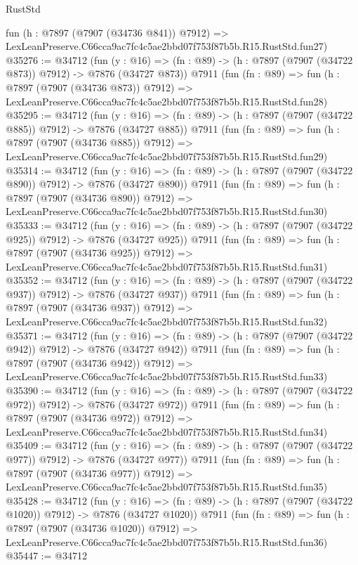 \begin{lexlean}{RustStd}
\begin{coremodule}
    fun (h : @7897 (@7907 (@34736 @841)) @7912) =>
    LexLeanPreserve.C66cca9ac7fc4c5ae2bbd07f753f87b5b.R15.RustStd.fun27)
@35276 := @34712
    (fun (y : @16) => (fn : @89) -> (h : @7897 (@7907 (@34722 @873)) @7912) -> @7876 (@34727 @873))
    @7911
    (fun (fn : @89) =>
    fun (h : @7897 (@7907 (@34736 @873)) @7912) =>
    LexLeanPreserve.C66cca9ac7fc4c5ae2bbd07f753f87b5b.R15.RustStd.fun28)
@35295 := @34712
    (fun (y : @16) => (fn : @89) -> (h : @7897 (@7907 (@34722 @885)) @7912) -> @7876 (@34727 @885))
    @7911
    (fun (fn : @89) =>
    fun (h : @7897 (@7907 (@34736 @885)) @7912) =>
    LexLeanPreserve.C66cca9ac7fc4c5ae2bbd07f753f87b5b.R15.RustStd.fun29)
@35314 := @34712
    (fun (y : @16) => (fn : @89) -> (h : @7897 (@7907 (@34722 @890)) @7912) -> @7876 (@34727 @890))
    @7911
    (fun (fn : @89) =>
    fun (h : @7897 (@7907 (@34736 @890)) @7912) =>
    LexLeanPreserve.C66cca9ac7fc4c5ae2bbd07f753f87b5b.R15.RustStd.fun30)
@35333 := @34712
    (fun (y : @16) => (fn : @89) -> (h : @7897 (@7907 (@34722 @925)) @7912) -> @7876 (@34727 @925))
    @7911
    (fun (fn : @89) =>
    fun (h : @7897 (@7907 (@34736 @925)) @7912) =>
    LexLeanPreserve.C66cca9ac7fc4c5ae2bbd07f753f87b5b.R15.RustStd.fun31)
@35352 := @34712
    (fun (y : @16) => (fn : @89) -> (h : @7897 (@7907 (@34722 @937)) @7912) -> @7876 (@34727 @937))
    @7911
    (fun (fn : @89) =>
    fun (h : @7897 (@7907 (@34736 @937)) @7912) =>
    LexLeanPreserve.C66cca9ac7fc4c5ae2bbd07f753f87b5b.R15.RustStd.fun32)
@35371 := @34712
    (fun (y : @16) => (fn : @89) -> (h : @7897 (@7907 (@34722 @942)) @7912) -> @7876 (@34727 @942))
    @7911
    (fun (fn : @89) =>
    fun (h : @7897 (@7907 (@34736 @942)) @7912) =>
    LexLeanPreserve.C66cca9ac7fc4c5ae2bbd07f753f87b5b.R15.RustStd.fun33)
@35390 := @34712
    (fun (y : @16) => (fn : @89) -> (h : @7897 (@7907 (@34722 @972)) @7912) -> @7876 (@34727 @972))
    @7911
    (fun (fn : @89) =>
    fun (h : @7897 (@7907 (@34736 @972)) @7912) =>
    LexLeanPreserve.C66cca9ac7fc4c5ae2bbd07f753f87b5b.R15.RustStd.fun34)
@35409 := @34712
    (fun (y : @16) => (fn : @89) -> (h : @7897 (@7907 (@34722 @977)) @7912) -> @7876 (@34727 @977))
    @7911
    (fun (fn : @89) =>
    fun (h : @7897 (@7907 (@34736 @977)) @7912) =>
    LexLeanPreserve.C66cca9ac7fc4c5ae2bbd07f753f87b5b.R15.RustStd.fun35)
@35428 := @34712
    (fun (y : @16) =>
    (fn : @89) -> (h : @7897 (@7907 (@34722 @1020)) @7912) -> @7876 (@34727 @1020))
    @7911
    (fun (fn : @89) =>
    fun (h : @7897 (@7907 (@34736 @1020)) @7912) =>
    LexLeanPreserve.C66cca9ac7fc4c5ae2bbd07f753f87b5b.R15.RustStd.fun36)
@35447 := @34712

\end{coremodule}
\end{lexlean}

